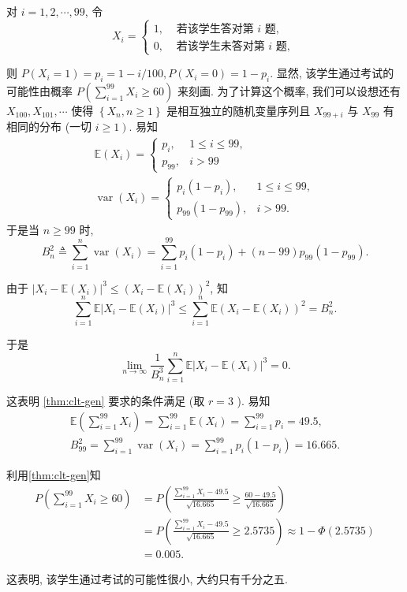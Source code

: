      \begin{solution}
        对 $i=1,2, \cdots, 99$, 令
$$
X_i= \begin{cases}1, & \text { 若该学生答对第 } i \text { 题, } \\ 0, & \text { 若该学生未答对第 } i \text { 题, }\end{cases}
$$

则 $P\left(X_i=1\right)=p_i=1-i / 100, P\left(X_i=0\right)=1-p_i$.
显然, 该学生通过考试的可能性由概率 $P\left(\sum_{i=1}^{99} X_i \geqslant 60\right)$ 来刻画. 为了计算这个概率, 我们可以设想还有 $X_{100}, X_{101}, \cdots$ 使得 $\left\{X_n, n \geqslant 1\right\}$ 是相互独立的随机变量序列且 $X_{99+i}$ 与 $X_{99}$ 有相同的分布 (一切 $\left.i \geqslant 1\right)$. 易知
$$
\begin{gathered}
\mathbb{E}\left(X_i\right)= \begin{cases}p_i, & 1 \leq i \leq 99, \\
p_{99}, & i>99\end{cases} \\
\operatorname{var}\left(X_i\right)= \begin{cases}p_i\left(1-p_i\right), & 1 \leq i \leq 99, \\
p_{99}\left(1-p_{99}\right), & i>99 .\end{cases}
\end{gathered}
$$
于是当 $n \geqslant 99$ 时,
$$
B_n^2 \triangleq \sum_{i=1}^n \operatorname{var}\left(X_i\right)=\sum_{i=1}^{99} p_i\left(1-p_i\right)+(n-99) p_{99}\left(1-p_{99}\right) .
$$

由于 $\left|X_i-\mathbb{E}\left(X_i\right)\right|^3 \leq\left(X_i-\mathbb{E}\left(X_i\right)\right)^2$, 知
$$
\sum_{i=1}^n \mathbb{E}\left|X_i-\mathbb{E}\left(X_i\right)\right|^3 \leq \sum_{i=1}^n \mathbb{E}\left(X_i-\mathbb{E}\left(X_i\right)\right)^2=B_n^2 .
$$

于是$$
\lim _{n \rightarrow \infty} \frac{1}{B_n^3} \sum_{i=1}^n \mathbb{E}\left|X_i-\mathbb{E}\left(X_i\right)\right|^3=0 .
$$

这表明 \cref{thm:clt-gen} 要求的条件满足 (取 $r=3$ ). 易知
$$
\begin{gathered}
\mathbb{E}\left(\sum_{i=1}^{99} X_i\right)=\sum_{i=1}^{99} \mathbb{E}\left(X_i\right)=\sum_{i=1}^{99} p_i=49.5, \\
B_{99}^2=\sum_{i=1}^{99} \operatorname{var}\left(X_i\right)=\sum_{i=1}^{99} p_i\left(1-p_i\right)=16.665 .
\end{gathered}
$$

利用\cref{thm:clt-gen}知
$$
\begin{aligned}
P\left(\sum_{i=1}^{99} X_i \geqslant 60\right)&=P\left(\frac{\sum_{i=1}^{99} X_i-49.5}{\sqrt{16.665}} \geqslant \frac{60-49.5}{\sqrt{16.665}}\right)  \\
& =P\left(\frac{\sum_{i=1}^{99} X_i-49.5}{\sqrt{16.665}} \geqslant 2.5735\right) \approx 1-\Phi(2.5735) \\
& =0.005 .
\end{aligned}
$$

这表明, 该学生通过考试的可能性很小, 大约只有千分之五.
     \end{solution}